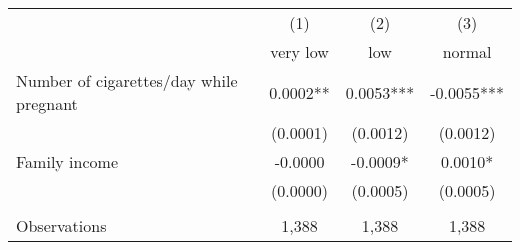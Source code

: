 \begin{tabular}{l *{3}{c}}
\toprule
                    &         (1)   &         (2)   &         (3)   \\
 & very low & low & normal \\
\midrule
Number of cigarettes/day while pregnant&      0.0002** &      0.0053***&     -0.0055***\\
                    &    (0.0001)   &    (0.0012)   &    (0.0012)   \\
Family income       &     -0.0000   &     -0.0009*  &      0.0010*  \\
                    &    (0.0000)   &    (0.0005)   &    (0.0005)   \\
\\
Observations        &       1,388   &       1,388   &       1,388   \\
\bottomrule
\end{tabular}
